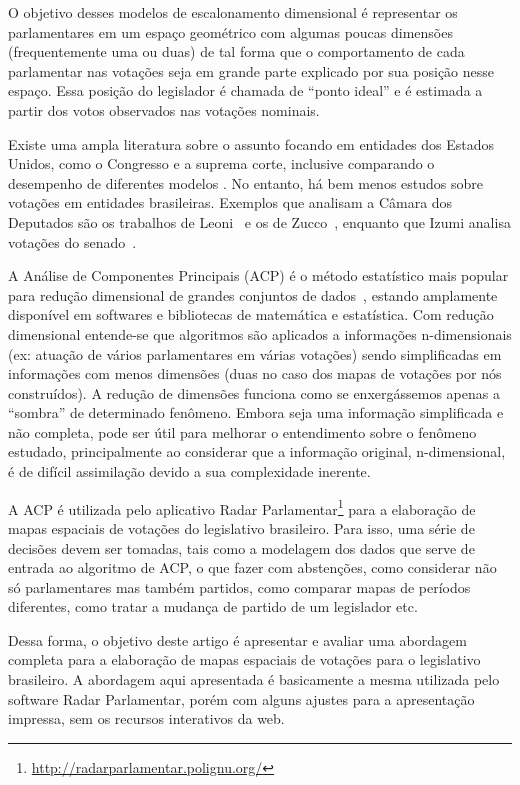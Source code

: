 \documentclass[
	article,			%
	12pt,				%
	oneside,			%
	a4paper,			%
	english,			%
	brazil,				%
	sumario=tradicional,
	oldfontcommands %
	]{abntex2}
\begin{document}
O objetivo desses modelos de escalonamento dimensional é representar os parlamentares em um espaço geométrico com algumas poucas dimensões (frequentemente uma ou duas) de tal forma que o comportamento de cada parlamentar nas votações seja em grande parte explicado por sua posição nesse espaço. Essa posição do legislador é chamada de ``ponto ideal'' e é estimada a partir dos votos observados nas votações nominais.

Existe uma ampla literatura sobre o assunto focando em entidades dos Estados Unidos, como o Congresso e a suprema corte, inclusive comparando o desempenho de diferentes modelos 
\cite{poole-rosenthal2000,clinton2004ideal}.
No entanto, há bem menos estudos sobre votações em entidades brasileiras. Exemplos que analisam a Câmara dos Deputados são os trabalhos de Leoni~\cite{leoni02cdep} e os de Zucco~\cite{zucco2011ideologia, zucco2011distinguishing}, enquanto que Izumi analisa votações do senado~\cite{izumi2016senado}. 

A Análise de Componentes Principais (ACP) é o método estatístico mais popular para redução dimensional de grandes conjuntos de dados~\cite{DataMining2003}, estando amplamente disponível em softwares e bibliotecas de matemática e estatística. Com redução dimensional entende-se que algoritmos são aplicados a informações n-dimensionais (ex: atuação de vários parlamentares em várias votações) sendo simplificadas em informações com menos dimensões (duas no caso dos mapas de votações por nós construídos). A redução de dimensões funciona como se enxergássemos apenas a ``sombra'' de determinado fenômeno. Embora seja uma informação simplificada e não completa, pode ser útil para melhorar o entendimento sobre o fenômeno estudado, principalmente ao considerar que a informação original, n-dimensional, é de difícil assimilação devido a sua complexidade inerente.

A ACP é utilizada pelo aplicativo Radar Parlamentar\footnote{\url{http://radarparlamentar.polignu.org/}} para a elaboração de mapas espaciais de votações do legislativo brasileiro. Para isso, uma série de decisões devem ser tomadas, tais como a modelagem dos dados que serve de entrada ao algoritmo de ACP, o que fazer com abstenções, como considerar não só parlamentares mas também partidos, como comparar mapas de períodos diferentes, como tratar a mudança de partido de um legislador etc.

Dessa forma, o objetivo deste artigo é apresentar e avaliar uma abordagem completa para a elaboração de mapas espaciais de votações para o legislativo brasileiro. A abordagem aqui apresentada é basicamente a mesma utilizada pelo software Radar Parlamentar, porém com alguns ajustes para a apresentação impressa, sem os recursos interativos da web.
\end{document}
